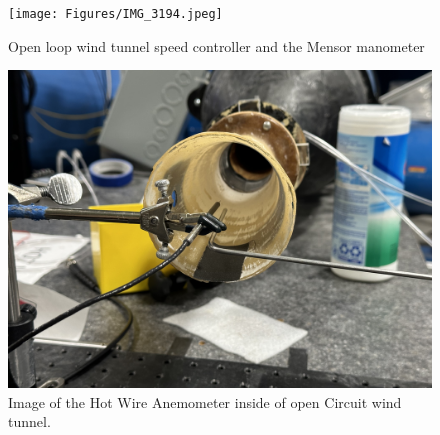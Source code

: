 \begin{figure}[htpb]
    \centering
    \texttt{[image: Figures/IMG\_3194.jpeg]}
    \caption[Open loop wind tunnel speed controller and the Mensor manometer]{Open loop wind tunnel speed controller and the Mensor manometer}
    \label{fig: SpeedControl}
\end{figure}

\begin{figure}[htpb]
    \centering
    \includegraphics[width=0.75\linewidth]{Figures/IMG_3195.jpeg}
    \caption[Image of the Hot Wire Anemometer inside of open Circuit wind tunnel.]{Image of the Hot Wire Anemometer inside of open Circuit wind tunnel.}
    \label{fig: HotWireAndPitotFairPicture}
    \vspace*{5.5in}
\end{figure}


